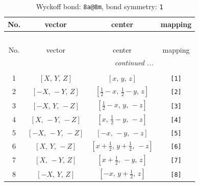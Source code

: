 \documentclass[fleqn,8pt]{jsarticle}
\begin{document}
\begin{longtable}{cccc}
\caption{Wyckoff bond: {\tt 8a@8m}, bond symmetry: {\tt 1}}
 \\
 \hline \hline
No. & vector & center & mapping \\ \hline \endfirsthead

\multicolumn{3}{l}{\tablename\ \thetable{}} \\
 \hline \hline
No. & vector & center & mapping \\ \hline \endhead

 \hline \hline
\multicolumn{3}{r}{\footnotesize\it continued ...} \\ \endfoot

 \hline \hline
\multicolumn{3}{r}{} \\ \endlastfoot

1 & $\left[ X,\, Y,\, Z \right]$ & $\left[ x,\, y,\, z \right]$ & {\tt [1]} \\ \hline
2 & $\left[ - X,\, - Y,\, Z \right]$ & $\left[ \frac{1}{2} - x,\, \frac{1}{2} - y,\, z \right]$ & {\tt [2]} \\ \hline
3 & $\left[ - X,\, Y,\, - Z \right]$ & $\left[ \frac{1}{2} - x,\, y,\, - z \right]$ & {\tt [3]} \\ \hline
4 & $\left[ X,\, - Y,\, - Z \right]$ & $\left[ x,\, \frac{1}{2} - y,\, - z \right]$ & {\tt [4]} \\ \hline
5 & $\left[ - X,\, - Y,\, - Z \right]$ & $\left[ - x,\, - y,\, - z \right]$ & {\tt [5]} \\ \hline
6 & $\left[ X,\, Y,\, - Z \right]$ & $\left[ x + \frac{1}{2},\, y + \frac{1}{2},\, - z \right]$ & {\tt [6]} \\ \hline
7 & $\left[ X,\, - Y,\, Z \right]$ & $\left[ x + \frac{1}{2},\, - y,\, z \right]$ & {\tt [7]} \\ \hline
8 & $\left[ - X,\, Y,\, Z \right]$ & $\left[ - x,\, y + \frac{1}{2},\, z \right]$ & {\tt [8]} \\
\end{longtable}
\end{document}
